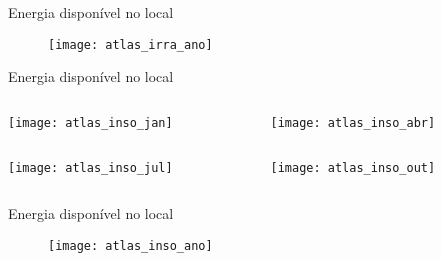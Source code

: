 \begin{frame}{Energia disponível no local}

\begin{figure}[H]
	\texttt{[image: atlas\_irra\_ano]}
\end{figure}

\end{frame}

\begin{frame}{Energia disponível no local}

\begin{columns}[T]
    \begin{column}{0.5\textwidth}
    	\centering
      	\texttt{[image: atlas\_inso\_jan]}
    \end{column}
    \begin{column}{0.5\textwidth}
    	\centering
      	\texttt{[image: atlas\_inso\_abr]}
    \end{column}
\end{columns}

\vspace{.25cm}

\begin{columns}[T]
    \begin{column}{0.5\textwidth}
    	\centering
      	\texttt{[image: atlas\_inso\_jul]}
    \end{column}
    \begin{column}{0.5\textwidth}
    	\centering
      	\texttt{[image: atlas\_inso\_out]}
    \end{column}
\end{columns}

\end{frame}

\begin{frame}{Energia disponível no local}

\begin{figure}[H]
	\texttt{[image: atlas\_inso\_ano]}
\end{figure}

\end{frame}

